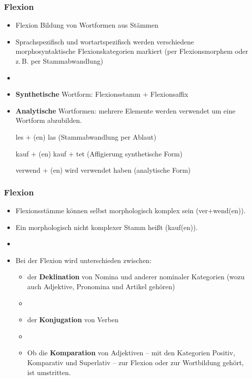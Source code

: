 
\begin{frame}
\frametitle{Flexion}

\begin{itemize}
	\item Flexion \ras Bildung von Wortformen aus Stämmen
	\item Sprachspezifisch und wortartspezifisch werden verschiedene morphosyntaktische Flexionskategorien markiert (per Flexionsmorphem oder z.\,B. per Stammabwandlung)
	\item[]
	\item \textbf{Synthetische} Wortform: Flexionsstamm $+$ Flexionsaffix
	\item \textbf{Analytische} Wortformen: mehrere Elemente werden verwendet um eine Wortform abzubilden.
	
	\ea les $+$ (en) \ras las (Stammabwandlung per Ablaut)
	\z
	
	\ea kauf $+$ (en) \ras kauf $+$ tet (Affigierung \ras  synthetische Form)
	\z
	
	\ea verwend $+$ (en) \ras wird verwendet haben (analytische Form)
	\z
	
\end{itemize}


\end{frame}




\begin{frame}
\frametitle{Flexion}

\begin{itemize}
	\item Flexionsstämme können selbst morphologisch komplex sein (ver$+$wend(en)).
	\item Ein morphologisch nicht komplexer Stamm heißt  (kauf(en)).
	\item[] 
	\item Bei der Flexion wird unterschieden zwischen:
	
	\begin{itemize}
		\item der \textbf{Deklination} von Nomina und anderer nominaler Kategorien (wozu auch Adjektive, Pronomina und Artikel gehören)
		\item[]
		\item der \textbf{Konjugation} von Verben 
		\item[]
		\item Ob die \textbf{Komparation} von Adjektiven -- mit den Kategorien Positiv, Komparativ und Superlativ -- zur Flexion oder zur Wortbildung gehört, ist umstritten.
	\end{itemize}
	
\end{itemize}

\end{frame}



